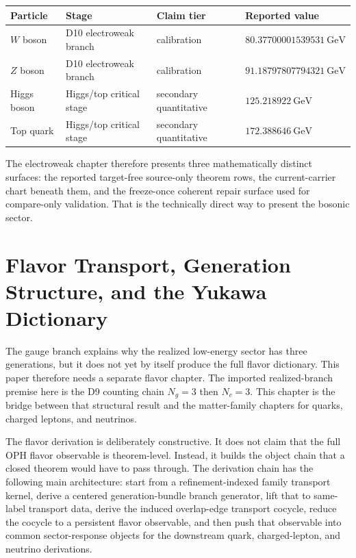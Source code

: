 \documentclass[11pt]{article}
\begin{document}
\begin{table}[h]
\centering
\small
\begin{tabular}{@{}llll@{}}
\toprule
Particle & Stage & Claim tier & Reported value \\
\midrule
\(W\) boson & D10 electroweak branch & calibration & \(80.37700001539531~\mathrm{GeV}\) \\
\(Z\) boson & D10 electroweak branch & calibration & \(91.18797807794321~\mathrm{GeV}\) \\
Higgs boson & Higgs/top critical stage & secondary quantitative & \(125.218922~\mathrm{GeV}\) \\
Top quark & Higgs/top critical stage & secondary quantitative & \(172.388646~\mathrm{GeV}\) \\
\bottomrule
\end{tabular}
\end{table}

The electroweak chapter therefore presents three mathematically distinct surfaces: the reported
target-free source-only theorem rows, the current-carrier chart beneath them, and the freeze-once
coherent repair surface used for compare-only validation. That is the technically direct way to
present the bosonic sector.

\section{Flavor Transport, Generation Structure, and the Yukawa Dictionary}

The gauge branch explains why the realized low-energy sector has three generations, but it does
not yet by itself produce the full flavor dictionary. This paper therefore needs a
separate flavor chapter. The imported realized-branch premise here is the D9 counting chain
\(N_g=3\) then \(N_c=3\). This chapter is the bridge between that structural result and the
matter-family chapters for quarks, charged leptons, and neutrinos.

The flavor derivation is deliberately constructive. It does not claim that the full
OPH flavor observable is theorem-level. Instead, it builds the object chain that a
closed theorem would have to pass through. The derivation chain has the following main
architecture: start from a refinement-indexed family transport kernel, derive a centered
generation-bundle branch generator, lift that to same-label transport data, derive the induced
overlap-edge transport cocycle, reduce the cocycle to a persistent flavor observable, and then
push that observable into common sector-response objects for the downstream quark, charged-lepton,
and neutrino derivations.
\end{document}
